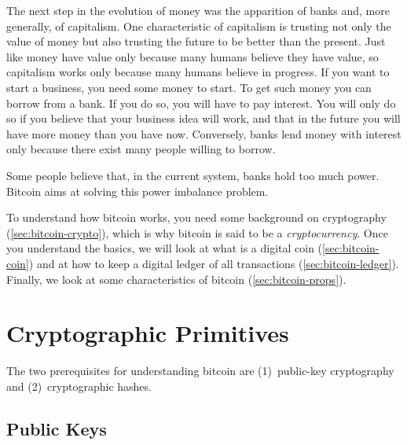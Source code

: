 The next step in the evolution of money was the apparition of banks and, more generally, of capitalism.
One characteristic of capitalism is trusting not only the value of money but also trusting the future to be better than the present.
Just like money have value only because many humans believe they have value, so capitalism works only because many humans believe in progress.
If you want to start a business, you need some money to start.
To get such money you can borrow from a bank.
If you do so, you will have to pay interest.
You will only do so if you believe that your business idea will work, and that in the future you will have more money than you have now.
Conversely, banks lend money with interest only because there exist many people willing to borrow.

Some people believe that, in the current system, banks hold too much power.
Bitcoin aims at solving this power imbalance problem.

To understand how bitcoin works, you need some background on cryptography (\autoref{sec:bitcoin-crypto}), which is why bitcoin is said to be a \emph{cryptocurrency}.
Once you understand the basics, we will look at what is a digital coin (\autoref{sec:bitcoin-coin}) and at how to keep a digital ledger of all transactions (\autoref{sec:bitcoin-ledger}).
Finally, we look at some characteristics of bitcoin (\autoref{sec:bitcoin-props}).


\section{Cryptographic Primitives}\label{sec:bitcoin-crypto}

The two prerequisites for understanding bitcoin are (1)~public-key cryptography and (2)~cryptographic hashes.

\subsection{Public Keys}

